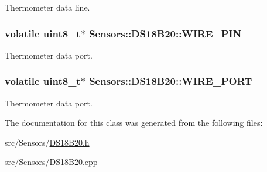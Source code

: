Thermometer data line. 

\subsubsection[{\texorpdfstring{W\+I\+R\+E\+\_\+\+P\+IN}{WIRE_PIN}}]{\setlength{\rightskip}{0pt plus 5cm}volatile uint8\+\_\+t$\ast$ Sensors\+::\+D\+S18\+B20\+::\+W\+I\+R\+E\+\_\+\+P\+IN\hspace{0.3cm}{\ttfamily [private]}}\hypertarget{classSensors_1_1DS18B20_ada7da2f14ca56ef0598caedd5c96ea7a}{}\label{classSensors_1_1DS18B20_ada7da2f14ca56ef0598caedd5c96ea7a}


Thermometer data port. 

\subsubsection[{\texorpdfstring{W\+I\+R\+E\+\_\+\+P\+O\+RT}{WIRE_PORT}}]{\setlength{\rightskip}{0pt plus 5cm}volatile uint8\+\_\+t$\ast$ Sensors\+::\+D\+S18\+B20\+::\+W\+I\+R\+E\+\_\+\+P\+O\+RT\hspace{0.3cm}{\ttfamily [private]}}\hypertarget{classSensors_1_1DS18B20_a6a769e836e36f4975918eb52f6e00309}{}\label{classSensors_1_1DS18B20_a6a769e836e36f4975918eb52f6e00309}


Thermometer data port. 



The documentation for this class was generated from the following files\+:\begin{DoxyCompactItemize}
\item 
src/\+Sensors/\hyperlink{DS18B20_8h}{D\+S18\+B20.\+h}\item 
src/\+Sensors/\hyperlink{DS18B20_8cpp}{D\+S18\+B20.\+cpp}\end{DoxyCompactItemize}

